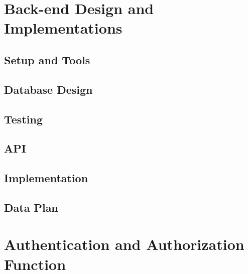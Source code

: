 \section{Back-end Design and Implementations}
\label{sec:sec03}


\subsection{Setup and Tools}
\label{subsubsec:dbsetup}


\subsection{Database Design}
\label{subsubsec:Database Design}


\subsection{Testing}
\label{subsubsec:dbtesting}
%

\subsection{API}
\label{subsubsec:dbdesign}


\subsection{Implementation}
\label{subsubsec:dbimplementation}


\subsection{Data Plan}
\label{subsubsec:dbdataplan}
%

\section{Authentication and Authorization Function}
\label{sec:sec03}
